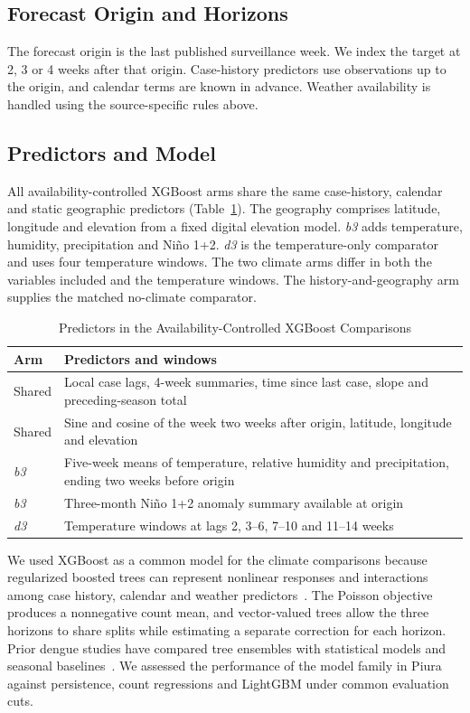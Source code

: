 \documentclass[journal]{IEEEtran}
\newcommand{\bthree}{\textit{b3}}
\newcommand{\dthree}{\textit{d3}}
\begin{document}
\subsection{Forecast Origin and Horizons}
The forecast origin is the last published surveillance week. We index the target at 2, 3 or 4 weeks after that origin. Case-history predictors use observations up to the origin, and calendar terms are known in advance. Weather availability is handled using the source-specific rules above.

\subsection{Predictors and Model}
All availability-controlled XGBoost arms share the same case-history, calendar and static geographic predictors (Table~\ref{tab:predictors}). The geography comprises latitude, longitude and elevation from a fixed digital elevation model. \bthree{} adds temperature, humidity, precipitation and Ni\~no 1+2. \dthree{} is the temperature-only comparator and uses four temperature windows. The two climate arms differ in both the variables included and the temperature windows. The history-and-geography arm supplies the matched no-climate comparator.

\begin{table}[!t]
\caption{Predictors in the Availability-Controlled XGBoost Comparisons}
\label{tab:predictors}
\centering
\begin{tabular}{@{}l p{}@{}}
\toprule
Arm & Predictors and windows\\
\midrule
Shared & Local case lags, 4-week summaries, time since last case, slope and preceding-season total\\
Shared & Sine and cosine of the week two weeks after origin, latitude, longitude and elevation\\
\bthree{} & Five-week means of temperature, relative humidity and precipitation, ending two weeks before origin\\
\bthree{} & Three-month Ni\~no 1+2 anomaly summary available at origin\\
\dthree{} & Temperature windows at lags 2, 3--6, 7--10 and 11--14 weeks\\
\bottomrule
\end{tabular}
\end{table}

We used XGBoost as a common model for the climate comparisons because regularized boosted trees can represent nonlinear responses and interactions among case history, calendar and weather predictors~\cite{chen2016}. The Poisson objective produces a nonnegative count mean, and vector-valued trees allow the three horizons to share splits while estimating a separate correction for each horizon. Prior dengue studies have compared tree ensembles with statistical models and seasonal baselines~\cite{chen2025,roster2022}. We assessed the performance of the model family in Piura against persistence, count regressions and LightGBM under common evaluation cuts.
\end{document}
